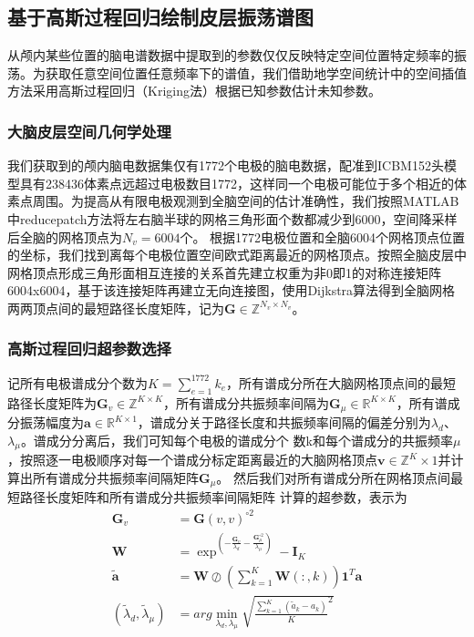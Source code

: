\subsection{基于高斯过程回归绘制皮层振荡谱图}\label{ch:kriging}
从颅内某些位置的脑电谱数据中提取到的参数仅仅反映特定空间位置特定频率的振荡。为获取任意空间位置任意频率下的谱值，我们借助地学空间统计中的空间插值方法采用高斯过程回归（Kriging法）根据已知参数估计未知参数。

\subsubsection{大脑皮层空间几何学处理}
我们获取到的颅内脑电数据集仅有1772个电极的脑电数据，配准到ICBM152头模型具有238436体素点远超过电极数目1772，这样同一个电极可能位于多个相近的体素点周围。为提高从有限电极观测到全脑空间的估计准确性，我们按照MATLAB中reducepatch方法将左右脑半球的网格三角形面个数都减少到6000，空间降采样后全脑的网格顶点为$N_v=6004$个。 根据1772电极位置和全脑6004个网格顶点位置的坐标，我们找到离每个电极位置空间欧式距离最近的网格顶点。按照全脑皮层中网格顶点形成三角形面相互连接的关系首先建立权重为非0即1的对称连接矩阵6004x6004，基于该连接矩阵再建立无向连接图，使用Dijkstra算法得到全脑网格两两顶点间的最短路径长度矩阵，记为$\mathbf{G}\in{\mathbb{Z}^{N_v\times{N_v}}}$。

\subsubsection{高斯过程回归超参数选择}
记所有电极谱成分个数为$K=\sum_{e=1}^{1772}k_e$，所有谱成分所在大脑网格顶点间的最短路径长度矩阵为$\mathbf{G}_v\in{\mathbb{Z}^{K\times{K}}}$，所有谱成分共振频率间隔为$\mathbf{G}_\mu\in{\mathbb{R}^{K\times{K}}}$，所有谱成分振荡幅度为$\mathbf{a}\in{\mathbb{R}^{K\times1}}$，谱成分关于路径长度和共振频率间隔的偏差分别为$\lambda_d$、$\lambda_\mu$。谱成分分离后，我们可知每个电极的谱成分个
数k和每个谱成分的共振频率$\mu$，按照逐一电极顺序对每一个谱成分标定距离最近的大脑网格顶点$\mathbf{v}\in{\mathbb{Z}^{K}\times1}$并计算出所有谱成分共振频率间隔矩阵$\mathbf{G}_\mu$。 然后我们对所有谱成分所在网格顶点间最短路径长度矩阵和所有谱成分共振频率间隔矩阵
计算的超参数，表示为
\begin{equation}\label{eq15}
\begin{aligned}
\mathbf{G}_v& = \mathbf{G}(v,v)^{\circ2}\\
\mathbf{W}& =\exp^{(-\frac{\mathbf{G}_v}{\lambda_d}-\frac{\mathbf{G}_\mu^{\circ2}}{\lambda_\mu})}-\mathbf{I}_K\\
\tilde{\mathbf{a}}& =\mathbf{W}\oslash{(\sum_{k=1}^K\mathbf{W}(:,k))\mathbf{1}^T}\mathbf{a}\\
(\tilde{\lambda}_d,\tilde{\lambda}_\mu)& =arg\min_{\lambda_d,\lambda_\mu}\sqrt{{\frac{\sum_{k=1}^{K}(\tilde{a}_k-a_k)}{K}}^2}
\end{aligned}
\end{equation}


